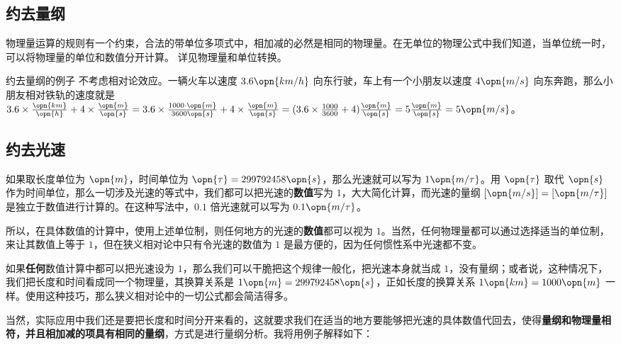

\subsection{约去量纲}

物理量运算的规则有一个约束，合法的带单位多项式中，相加减的必然是相同的物理量。在无单位的物理公式中我们知道，当单位统一时，可以将物理量的单位和数值分开计算。 详见物理量和单位转换。

\begin{example}{约去量纲的例子}
不考虑相对论效应。一辆火车以速度 $3.6\opn{km/h}$ 向东行驶，车上有一个小朋友以速度 $4\opn{m/s}$ 向东奔跑，那么小朋友相对铁轨的速度就是 $3.6\times\frac{\opn{km}}{\opn{h}}+4\times\frac{\opn{m}}{\opn{s}}=3.6\times\frac{1000\cdot \opn{m}}{3600\opn{s}}+4\times\frac{\opn{m}}{\opn{s}}=(3.6\times\frac{1000}{3600}+4)\frac{\opn{m}}{\opn{s}}=5\frac{\opn{m}}{\opn{s}}=5\opn{m/s}$。
\end{example}

\subsection{约去光速}

如果取长度单位为 $\opn{m}$，时间单位为 $\opn{\tau}=299792458\opn{s}$，那么光速就可以写为 $1\opn{m/\tau}$。用 $\opn{\tau}$ 取代 $\opn{s}$ 作为时间单位，那么一切涉及光速的等式中，我们都可以把光速的\textbf{数值}写为 $1$，大大简化计算，而光速的量纲 $[\opn{m/s}]=[\opn{m/\tau}]$ 是独立于数值进行计算的。在这种写法中，$0.1$ 倍光速就可以写为 $0.1\opn{m/\tau}$。

所以，在具体数值的计算中，使用上述单位制，则任何地方的光速的\textbf{数值}都可以视为 $1$。当然，任何物理量都可以通过选择适当的单位制，来让其数值上等于 $1$，但在狭义相对论中只有令光速的数值为 $1$ 是最方便的，因为任何惯性系中光速都不变。

如果\textbf{任何}数值计算中都可以把光速设为 $1$，那么我们可以干脆把这个规律一般化，把光速本身就当成 $1$，没有量纲；或者说，这种情况下，我们把长度和时间看成同一个物理量，其换算关系是 $1\opn{m}=299792458\opn{s}$，正如长度的换算关系 $1\opn{km}=1000\opn{m}$ 一样。使用这种技巧，那么狭义相对论中的一切公式都会简洁得多。

当然，实际应用中我们还是要把长度和时间分开来看的，这就要求我们在适当的地方要能够把光速的具体数值代回去，使得\textbf{量纲和物理量相符，并且相加减的项具有相同的量纲}，方式是进行量纲分析。我将用例子解释如下：

